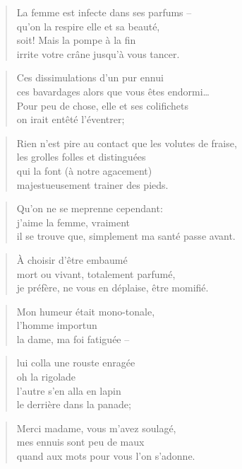 \newpage
{}
  \begin{verse}
    La femme est infecte dans ses parfums --\\
    qu’on la respire elle et sa beauté,\\
    soit! Mais la pompe à la fin\\
    irrite votre crâne jusqu’à vous tancer.
  \end{verse}
  \begin{verse}
    Ces dissimulations d’un pur ennui\\
    ces bavardages alors que vous êtes endormi…\\
    Pour peu de chose, elle et ses colifichets\\
    on irait entêté l’éventrer;
  \end{verse}
  \begin{verse}
    Rien n’est pire au contact que les volutes de fraise,\\
    les grolles folles et distinguées\\
    qui la font (à notre agacement)\\
    majestueusement trainer des pieds.
  \end{verse}
  \begin{verse}
    Qu’on ne se meprenne cependant:\\
    j’aime la femme, vraiment\\
    il se trouve que, simplement
    ma santé passe avant.
  \end{verse}
  \begin{verse}
    À choisir d’être embaumé\\
    mort ou vivant, totalement parfumé,\\
    je préfère, ne vous en déplaise, être momifié.
  \end{verse}

  \begin{verse}
    Mon humeur était mono-tonale,\\
    l’homme importun\\
    la dame, ma foi fatiguée --
  \end{verse}
  \begin{verse}
    lui colla une rouste enragée\\
    oh la rigolade\\
    l’autre s’en alla en lapin\\
    le derrière dans la panade;
  \end{verse}
  \begin{verse}
    Merci madame, vous m’avez soulagé,\\
    mes ennuis sont peu de maux\\
    quand aux mots pour vous l’on s’adonne.
  \end{verse}

